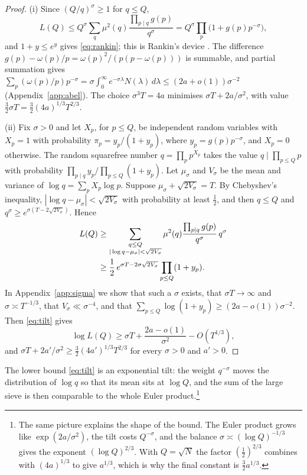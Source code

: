 \documentclass[aps,prd,twocolumn,superscriptaddress,nofootinbib,longbibliography,floatfix,showkeys,nobalancelastpage,amsmath,amssymb,10pt]{revtex4-2}
\theoremstyle{plain}
\theoremstyle{definition}
\theoremstyle{plain}
\begin{document}
\begin{proof}
(i) Since $(Q/q)^\sigma\ge1$ for $q\le Q$,
\[
L(Q)\le Q^\sigma\sum_q\mu^2(q)\frac{\prod_{p\mid q}g(p)}{q^\sigma}=Q^\sigma\prod_p\bigl(1+g(p)p^{-\sigma}\bigr),
\]
and $1+y\le e^y$ gives \eqref{eq:rankin}; this is Rankin's device \cite{Ran}. The difference $g(p)-\omega(p)/p=\omega(p)^2/(p(p-\omega(p)))$ is summable, and partial summation gives $\sum_p(\omega(p)/p)p^{-\sigma}=\sigma\int_0^\infty e^{-\sigma\lambda}N(\lambda)\,d\lambda\le(2a+o(1))\sigma^{-2}$ (Appendix~\ref{app:abel}). The choice $\sigma^3T=4a$ minimises $\sigma T+2a/\sigma^2$, with value $\frac32\sigma T=\frac32(4a)^{1/3}T^{2/3}$.

(ii) Fix $\sigma>0$ and let $X_p$, for $p\le Q$, be independent random variables with $X_p=1$ with probability $\pi_p=y_p/(1+y_p)$, where $y_p=g(p)p^{-\sigma}$, and $X_p=0$ otherwise. The random squarefree number $q=\prod_pp^{X_p}$ takes the value $q\mid\prod_{p\le Q}p$ with probability $\prod_{p\mid q}y_p/\prod_{p\le Q}(1+y_p)$. Let $\mu_\sigma$ and $V_\sigma$ be the mean and variance of $\log q=\sum_pX_p\log p$. Suppose $\mu_\sigma+\sqrt{2V_\sigma}=T$. By Chebyshev's inequality, $|\log q-\mu_\sigma|<\sqrt{2V_\sigma}$ with probability at least $\frac12$, and then $q\le Q$ and $q^\sigma\ge e^{\sigma(T-2\sqrt{2V_\sigma})}$. Hence
\begin{align}
L(Q)&\ge\sum_{\substack{q\le Q\\ |\log q-\mu_\sigma|<\sqrt{2V_\sigma}}}\mu^2(q)\frac{\prod_{p\mid q}g(p)}{q^\sigma}\,q^\sigma\notag\\
&\ge\frac12\,e^{\sigma T-2\sigma\sqrt{2V_\sigma}}\prod_{p\le Q}(1+y_p).\label{eq:tilt}
\end{align}
In Appendix~\ref{app:sigma} we show that such a $\sigma$ exists, that $\sigma T\to\infty$ and $\sigma\asymp T^{-1/3}$, that $V_\sigma\ll\sigma^{-4}$, and that $\sum_{p\le Q}\log(1+y_p)\ge(2a-o(1))\sigma^{-2}$. Then \eqref{eq:tilt} gives
\[
\log L(Q)\ge\sigma T+\frac{2a-o(1)}{\sigma^2}-O(T^{1/3}),
\]
and $\sigma T+2a'/\sigma^2\ge\frac32(4a')^{1/3}T^{2/3}$ for every $\sigma>0$ and $a'>0$.
\end{proof}

The lower bound \eqref{eq:tilt} is an exponential tilt: the weight $q^{-\sigma}$ moves the distribution of $\log q$ so that its mean sits at $\log Q$, and the sum of the large sieve is then comparable to the whole Euler product.\footnote{The same picture explains the shape of the bound. The Euler product grows like $\exp(2a/\sigma^2)$, the tilt costs $Q^{-\sigma}$, and the balance $\sigma\asymp(\log Q)^{-1/3}$ gives the exponent $(\log Q)^{2/3}$. With $Q=\sqrt N$ the factor $(\frac12)^{2/3}$ combines with $(4a)^{1/3}$ to give $a^{1/3}$, which is why the final constant is $\frac32a^{1/3}$.}
\end{document}
